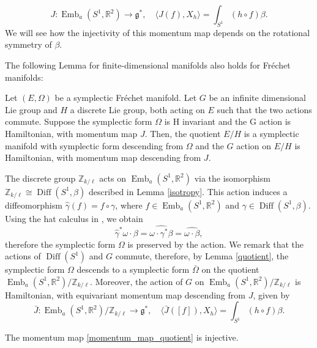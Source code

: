 \documentclass[11pt]{article}
\newcommand\on{\operatorname}
\newcommand\Emb{\on{Emb}}
\newcommand\Diff{\on{Diff}}
\newcommand\ZZ{\mathbb Z}
\newcommand\RR{\mathbb R}
\begin{document}
\begin{equation}\label{momentum_map}
J: \Emb_a(S^1, \RR^2) \to \mathfrak g^*, \quad \langle J(f), X_h\rangle = \int_{S^1}(h \circ f)\beta.
\end{equation}
We will see how the injectivity of this momentum map depends on the rotational symmetry of $\beta$. 

The following Lemma for finite-dimensional manifolds also holds for Fr\'echet manifolds: 

\begin{lemma}\label{quotient}
    Let $(E, \Omega)$ be a symplectic Fr\'echet manifold. Let $G$ be an infinite dimensional Lie group and $H$ a discrete Lie group, both acting on $E$ such that the two actions commute. Suppose the symplectic form $\Omega$ is H invariant and the G action is Hamiltonian, with momentum map $J$. Then, the quotient $E/H$ is a symplectic manifold with symplectic form descending from $\Omega$ and the $G$ action on $E/H$ is Hamiltonian, with momentum map descending from $J$. 
\end{lemma}


The discrete group $\mathbb Z_{k/\ell}$ acts on $\Emb_a(S^1, \RR^2)$ via the isomorphism $\mathbb Z_{k/\ell} \cong \Diff(S^1,\beta)$ described in Lemma \ref{isotropy}. This action induces a diffeomorphism $\hat\gamma(f) = f \circ \gamma$, where $f\in \Emb_a(S^1, \RR^2)$ and $\gamma \in \Diff(S^1,\beta)$. Using the hat calculus in \cite{V}, we obtain 
\begin{equation*}
\hat \gamma^*\widehat{\omega \cdot \beta} = \widehat{\omega \cdot \gamma^*\beta} = \widehat{\omega \cdot \beta},
\end{equation*}
therefore the symplectic form $\Omega$ is preserved by the action. We remark that the actions of $\Diff(S^1)$ and $G$ commute, therefore, by Lemma \ref{quotient}, the symplectic form $\Omega$ descends to a symplectic form $\bar\Omega$ on the quotient $\Emb_a(S^1, \RR^2)/\mathbb Z_{k/\ell}$. Moreover, the action of $G$ on $\Emb_a(S^1, \RR^2)/\ZZ_{k/\ell}$ is Hamiltonian, with equivariant momentum map descending from $J$, given by 
\begin{equation}\label{momentum_map_quotient}
\bar J: \Emb_a(S^1, \RR^2)/\mathbb Z_{k/\ell} \to \mathfrak g^*, \quad \langle \bar J([f]), X_h\rangle = \int_{S^1}(h \circ f)\beta. 
\end{equation}

\begin{lemma}\label{inj_mommap}
The momentum map \eqref{momentum_map_quotient} is injective.
\end{lemma}
\end{document}
